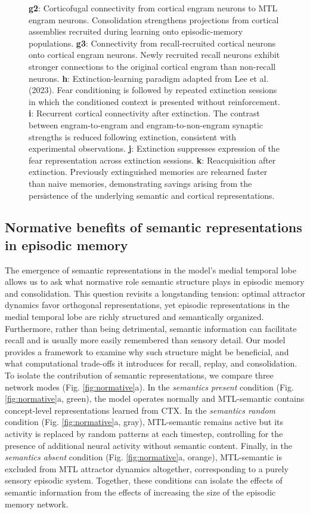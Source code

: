 \documentclass{article}
\begin{document}
\begin{figure}[h!]
{\textbf{g2}: Corticofugal connectivity from cortical engram neurons to MTL engram neurons. Consolidation strengthens projections from cortical assemblies recruited during learning onto episodic-memory populations.
\textbf{g3}: Connectivity from recall-recruited cortical neurons onto cortical engram neurons. Newly recruited recall neurons exhibit stronger connections to the original cortical engram than non-recall neurons.
\textbf{h}: Extinction-learning paradigm adapted from Lee et al. (2023). Fear conditioning is followed by repeated extinction sessions in which the conditioned context is presented without reinforcement.
\textbf{i}: Recurrent cortical connectivity after extinction. The contrast between engram-to-engram and engram-to-non-engram synaptic strengths is reduced following extinction, consistent with experimental observations.
\textbf{j}: Extinction suppresses expression of the fear representation across extinction sessions.
\textbf{k}: Reacquisition after extinction. Previously extinguished memories are relearned faster than naive memories, demonstrating savings arising from the persistence of the underlying semantic and cortical representations.}
\end{figure}
\newpage
\subsection*{Normative benefits of semantic representations in episodic memory}
The emergence of semantic representations in the model’s medial temporal lobe allows us to ask what normative role semantic structure plays in episodic memory and consolidation. This question revisits a longstanding tension: optimal attractor dynamics favor orthogonal representations, yet episodic representations in the medial temporal lobe are richly structured and semantically organized. Furthermore, rather than being detrimental, semantic information can facilitate recall and is usually more easily remembered than sensory detail. Our model provides a framework to examine why such structure might be beneficial, and what computational trade-offs it introduces for recall, replay, and consolidation.
\newline\newline
To isolate the contribution of semantic representations, we compare three network modes (Fig. \ref{fig:normative}a). In the \textit{semantics present} condition (Fig. \ref{fig:normative}a, green), the model operates normally and MTL-semantic contains concept-level representations learned from CTX. In the \textit{semantics random} condition (Fig. \ref{fig:normative}a, gray), MTL-semantic remains active but its activity is replaced by random patterns at each timestep, controlling for the presence of additional neural activity without semantic content. Finally, in the \textit{semantics absent} condition (Fig. \ref{fig:normative}a, orange), MTL-semantic is excluded from MTL attractor dynamics altogether, corresponding to a purely sensory episodic system. Together, these conditions can isolate the effects of semantic information from the effects of increasing the size of the episodic memory network.
\end{document}
